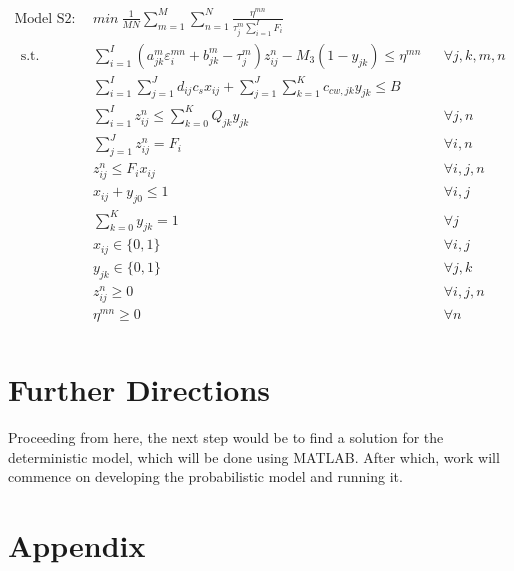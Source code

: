 \documentclass[preprint,12pt,authoryear]{elsarticle}
\begin{document}
\pagebreak
\begin{equation*}\label{modelS2}
\begin{aligned}
	\text{Model S2}:~~&min ~ \frac{1}{MN}\sum_{m=1}^M\sum_{n=1}^N \frac{\eta^{mn}}{\tau_j^m \sum_{i=1}^I F_i} \\~~
	\mbox{s.t.}~~
	&\sum_{i=1}^I (a_{jk}^m \varepsilon_i^{mn} + b_{jk}^m - \tau_j^m) z_{ij}^n - M_3 (1 - y_{jk})\leq \eta^{mn} && \forall j,k,m,n\\	
	&\sum_{i=1}^{I}\sum_{j=1}^{J}d_{ij}c_s x_{ij} + \sum_{j=1}^{J}\sum_{k=1}^{K}c_{cw,jk}y_{jk} \leq B && \\
 	&\sum_{i=1}^{I} z_{ij}^n \leq \sum_{k=0}^K Q_{jk} y_{jk} && \forall j,n\\
	&\sum_{j=1}^J z_{ij}^n = F_i && \forall i,n\\
	&z_{ij}^n \leq F_i x_{ij} && \forall i,j,n\\
	&x_{ij} + y_{j0} \leq 1 && \forall i,j\\
	&\sum_{k=0}^{K}y_{jk} = 1&&\forall j\\
	&x_{ij} \in \{0,1\}&&\forall i,j\\
	&y_{jk} \in \{0,1\}&&\forall j,k\\
	&z_{ij}^n \geq 0&&\forall i,j,n\\ 
	&\eta^{mn} \geq 0&&\forall n\\
\end{aligned}
\end{equation*}
\newpage


\section{Further Directions}
Proceeding from here, the next step would be to find a solution for the deterministic model, which will be done using MATLAB. After which, work will commence on developing the probabilistic model and running it. 


\clearpage
\section*{Appendix}
\label{Chap:appendix}
\end{document}
